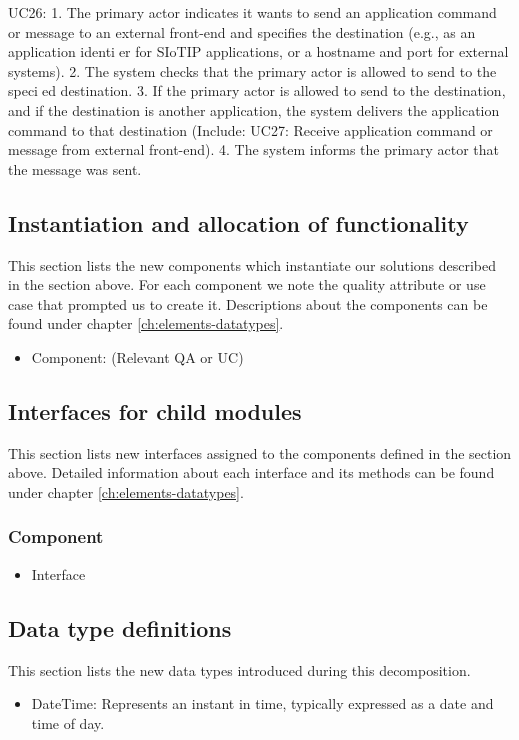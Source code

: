         UC26:
            1. The primary actor indicates it wants to send an application command or message to an external
                front-end and specifies the destination (e.g., as an application identier for SIoTIP applications,
                or a hostname and port for external systems).
            2. The system checks that the primary actor is allowed to send to the specied destination.
            3. If the primary actor is allowed to send to the destination, and if the destination is another
                application, the system delivers the application command to that destination (Include: UC27:
                Receive application command or message from external front-end).
            4. The system informs the primary actor that the message was sent.

        
\subsection{Instantiation and allocation of functionality}
    This section lists the new components which instantiate our solutions
    described in the section above. For each component we note the quality
    attribute or use case that prompted us to create it. Descriptions about
    the components can be found under chapter \ref{ch:elements-datatypes}. \\

    \begin{itemize}
        \item Component: (Relevant QA or UC)
    \end{itemize}


\subsection{Interfaces for child modules}
    This section lists new interfaces assigned to the components defined
    in the section above. Detailed information about each interface and
    its methods can be found under chapter \ref{ch:elements-datatypes}. \\

    \subsubsection{Component}
        \begin{itemize}
            \item Interface
        \end{itemize}

\subsection{Data type definitions}
    This section lists the new data types introduced during this decomposition.

    \begin{itemize}
        \item DateTime: Represents an instant in time, typically expressed as a date and time of day.
    \end{itemize}
